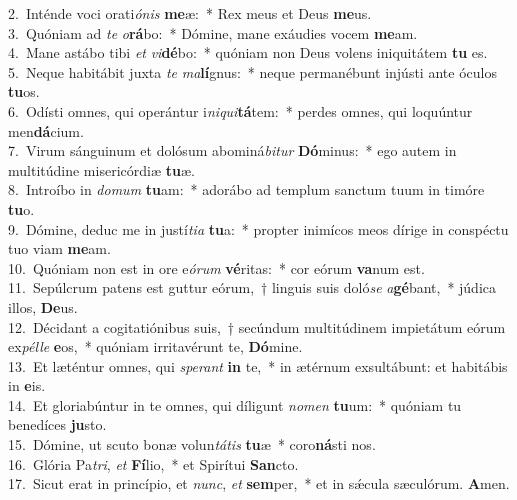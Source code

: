 {2.~}Inténde voci orati\textit{ó}\textit{nis} \textbf{me}æ:~* Rex meus et Deus \textbf{me}us.\\
{3.~}Quóniam ad \textit{te} \textit{o}\textbf{rá}bo:~* Dómine, mane exáudies vocem \textbf{me}am.\\
{4.~}Mane astábo tibi \textit{et} \textit{vi}\textbf{dé}bo:~* quóniam non Deus volens iniquitátem \textbf{tu} es.\\
{5.~}Neque habitábit juxta \textit{te} \textit{ma}\textbf{lí}gnus:~* neque permanébunt injústi ante óculos \textbf{tu}os.\\
{6.~}Odísti omnes, qui operántur i\textit{ni}\textit{qui}\textbf{tá}tem:~* perdes omnes, qui loquúntur men\textbf{dá}cium.\\
{7.~}Virum sánguinum et dolósum abominá\textit{bi}\textit{tur} \textbf{Dó}minus:~* ego autem in multitúdine misericórdiæ \textbf{tu}æ.\\
{8.~}Introíbo in \textit{do}\textit{mum} \textbf{tu}am:~* adorábo ad templum sanctum tuum in timóre \textbf{tu}o.\\
{9.~}Dómine, deduc me in justí\textit{ti}\textit{a} \textbf{tu}a:~* propter inimícos meos dírige in conspéctu tuo viam \textbf{me}am.\\
{10.~}Quóniam non est in ore e\textit{ó}\textit{rum} \textbf{vé}ritas:~* cor eórum \textbf{va}num est.\\
{11.~}Sepúlcrum patens est guttur eórum,~† linguis suis doló\textit{se} \textit{a}\textbf{gé}bant,~* júdica illos, \textbf{De}us.\\
{12.~}Décidant a cogitatiónibus suis,~† secúndum multitúdinem impietátum eórum ex\textit{pél}\textit{le} \textbf{e}os,~* quóniam irritavérunt te, \textbf{Dó}mine.\\
{13.~}Et læténtur omnes, qui \textit{spe}\textit{rant} \textbf{in} te,~* in ætérnum exsultábunt: et habitábis in \textbf{e}is.\\
{14.~}Et gloriabúntur in te omnes, qui díligunt \textit{no}\textit{men} \textbf{tu}um:~* quóniam tu benedíces \textbf{ju}sto.\\
{15.~}Dómine, ut scuto bonæ volun\textit{tá}\textit{tis} \textbf{tu}æ~* coro\textbf{ná}sti nos.\\
{16.~}Glória Pa\textit{tri}, \textit{et} \textbf{Fí}lio,~* et Spirítui \textbf{San}cto.\\
{17.~}Sicut erat in princípio, et \textit{nunc}, \textit{et} \textbf{sem}per,~* et in sǽcula sæculórum. \textbf{A}men.\\
